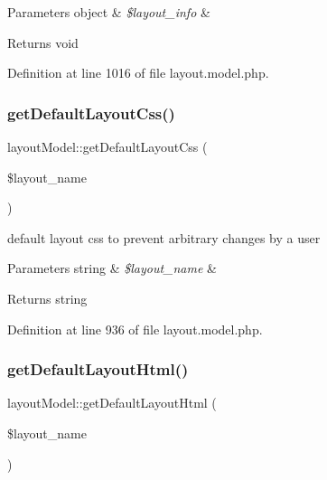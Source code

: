 \begin{DoxyParams}[1]{Parameters}
object & {\em \$layout\+\_\+info} & \\
\hline
\end{DoxyParams}
\begin{DoxyReturn}{Returns}
void 
\end{DoxyReturn}


Definition at line 1016 of file layout.\+model.\+php.

\hypertarget{classlayoutModel_a986cf32677527f2efeacb8e5c2bc68e6}{}\label{classlayoutModel_a986cf32677527f2efeacb8e5c2bc68e6} 
\subsubsection{\texorpdfstring{get\+Default\+Layout\+Css()}{getDefaultLayoutCss()}}
{\footnotesize\ttfamily layout\+Model\+::get\+Default\+Layout\+Css (\begin{DoxyParamCaption}\item[{}]{\$layout\+\_\+name }\end{DoxyParamCaption})}

default layout css to prevent arbitrary changes by a user 
\begin{DoxyParams}[1]{Parameters}
string & {\em \$layout\+\_\+name} & \\
\hline
\end{DoxyParams}
\begin{DoxyReturn}{Returns}
string 
\end{DoxyReturn}


Definition at line 936 of file layout.\+model.\+php.

\hypertarget{classlayoutModel_a1ec8ba060697878271fc70fbc0ce2867}{}\label{classlayoutModel_a1ec8ba060697878271fc70fbc0ce2867} 
\subsubsection{\texorpdfstring{get\+Default\+Layout\+Html()}{getDefaultLayoutHtml()}}
{\footnotesize\ttfamily layout\+Model\+::get\+Default\+Layout\+Html (\begin{DoxyParamCaption}\item[{}]{\$layout\+\_\+name }\end{DoxyParamCaption})}

